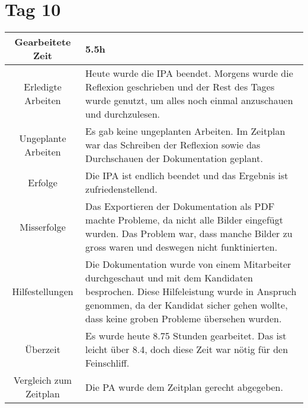 \section{Tag 10}
\begin{tabularx}{\textwidth}[H]{|c|X|}
  \hline
  Gearbeitete Zeit & 5.5h \\ \hline
  Erledigte Arbeiten & Heute wurde die IPA beendet. Morgens wurde die Reflexion geschrieben und der Rest des Tages
  wurde genutzt, um alles noch einmal anzuschauen und durchzulesen. \\ \hline
  Ungeplante Arbeiten & Es gab keine ungeplanten Arbeiten. Im Zeitplan war das Schreiben der Reflexion sowie das
  Durchschauen der Dokumentation geplant. \\ \hline
  Erfolge & Die IPA ist endlich beendet und das Ergebnis ist zufriedenstellend. \\ \hline
  Misserfolge & Das Exportieren der Dokumentation als PDF machte Probleme, da nicht alle Bilder eingefügt wurden.
  Das Problem war, dass manche Bilder zu gross waren und deswegen nicht funktinierten. \\ \hline
  Hilfestellungen & Die Dokumentation wurde von einem Mitarbeiter durchgeschaut und mit dem Kandidaten besprochen.
  Diese Hilfeleistung wurde in Anspruch genommen, da der Kandidat sicher gehen wollte, dass keine groben Probleme
  übersehen wurden. \\ \hline
  Überzeit & Es wurde heute 8.75 Stunden gearbeitet. Das ist leicht über 8.4, doch diese Zeit war nötig für den 
  Feinschliff. \\ \hline
  Vergleich zum Zeitplan & Die PA wurde dem Zeitplan gerecht abgegeben. \\ \hline
\end{tabularx}

